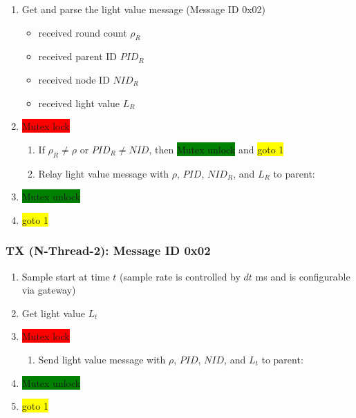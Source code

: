 \documentclass[letterpaper,10pt]{article}
\begin{document}
\begin{enumerate}
	\item Get and parse the light value message (Message ID 0x02)
	\begin{itemize}
		\item received round count $\rho_R$
		\item received parent ID $PID_R$
		\item received node ID $NID_R$
		\item received light value $L_R$
	\end{itemize}
	\item \colorbox{red}{Mutex lock}
	\begin{enumerate}
		\item If $\rho_R \neq \rho$ or $PID_R \neq NID$, then \colorbox{green}{Mutex unlock} and \colorbox{yellow}{goto 1}
		\item Relay light value message with $\rho$, $PID$, $NID_R$, and $L_R$ to parent:\\
	\end{enumerate}
	\item \colorbox{green}{Mutex unlock}
	\item \colorbox{yellow}{goto 1}
\end{enumerate}

\subsubsection{TX (N-Thread-2): Message ID 0x02}

\begin{enumerate}
	\item Sample start at time $t$ (sample rate is controlled by $dt$ ms and is configurable via gateway)
	\item Get light value $L_t$
	\item \colorbox{red}{Mutex lock}
	\begin{enumerate}
		\item Send light value message with $\rho$, $PID$, $NID$, and $L_t$ to parent:\\
	\end{enumerate}
	\item \colorbox{green}{Mutex unlock}
	\item \colorbox{yellow}{goto 1}
\end{enumerate}
\end{document}
